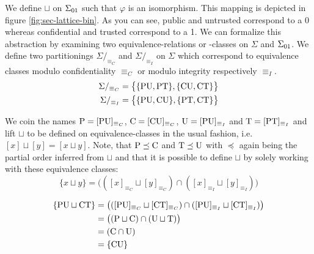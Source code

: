 We define $ \sqcup $ on $ \Sigma_{01} $ such that $ \varphi $ is an isomorphism.
This mapping is depicted in figure \ref{fig:sec-lattice-bin}.
As you can see, public and untrusted correspond to a 0 whereas confidential and trusted correspond to a 1.
We can formalize this abstraction by examining two equivalence-relations or -classes on $ \Sigma $ and $ \Sigma_{01} $.
We define two partitionings $ \Sigma/_{\equiv_C} $ and $ \Sigma/_{\equiv_I} $ on $ \Sigma $ which correspond to equivalence classes modulo confidentiality $ \equiv_C $ or modulo integrity respectively $ \equiv_I $.
\begin{align*}
    \Sigma /_{\equiv_C} &= \big\{ \{ \text{PU}, \text{PT} \}, \{ \text{CU}, \text{CT} \} \big\} \\
    \Sigma /_{\equiv_I} &= \big\{ \{ \text{PU}, \text{CU} \}, \{ \text{PT}, \text{CT} \} \big\}
\end{align*}

We coin the names $ \text{P} = [\text{PU}]_{\equiv_C} $, $ \text{C} = [\text{CU}]_{\equiv_C} $, $ \text{U} = [\text{PU}]_{\equiv_I} $ and $ \text{T} = [\text{PT}]_{\equiv_I} $ and lift $ \sqcup $ to be defined on equivalence-classes in the usual fashion, i.e. $ [x] \sqcup [y] = [x \sqcup y] $.
Note, that $ \text{P} \preceq \text{C} $ and $ \text{T} \preceq \text{U} $ with $ \preceq $ again being the partial order inferred from $ \sqcup $ and that it is possible to define $ \sqcup $ by solely working with these equivalence classes:
\begin{equation*}
    \{ x \sqcup y \} = \big(([x]_{\equiv_C} \sqcup [y]_{\equiv_C}) \cap ([x]_{\equiv_I} \sqcup [y]_{\equiv_I}) \big)
\end{equation*}

\begin{example}
    \begin{align*}
        \{ \text{PU} \sqcup \text{CT} \} &= \big(([\text{PU}]_{\equiv_C} \sqcup [\text{CT}]_{\equiv_C}) \cap ([\text{PU}]_{\equiv_I} \sqcup [\text{CT}]_{\equiv_I}) \big) \\
        &= \big((\text{P} \sqcup \text{C}) \cap (\text{U} \sqcup \text{T}) \big) \\
        &= (\text{C} \cap \text{U}) \\
        &= \{ \text{CU} \}
    \end{align*}
\end{example}

